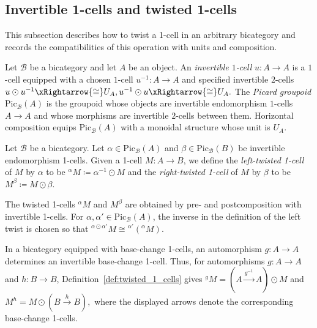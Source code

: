 \documentclass[11pt,oneside]{amsart}
\numberwithin{equation}{section}
\numberwithin{figure}{section}
\theoremstyle{plain}
\theoremstyle{definition}
\theoremstyle{remark}
\begin{document}
\subsection{Invertible 1-cells and twisted 1-cells}
This subsection describes how to twist a 1-cell in an arbitrary bicategory and records the compatibilities of this operation with units and composition.
\begin{definition}\label{def:invertible_1_cell}
Let \(\mathcal B\) be a bicategory and let \(A\) be an object.
An \emph{invertible \(1\)-cell} \(u\colon A\to A\) is a \(1\)-cell
equipped with a chosen \(1\)-cell \(u^{-1}\colon A\to A\) and
specified invertible \(2\)-cells
\(
u\odot u^{-1}\xRightarrow{\cong} U_A,
u^{-1}\odot u\xRightarrow{\cong} U_A.
\)
The \emph{Picard groupoid} \(\mathrm{Pic}_{\mathcal B}(A)\) is the groupoid
whose objects are invertible endomorphism \(1\)-cells \(A\to A\) and
whose morphisms are invertible \(2\)-cells between them. Horizontal
composition equips \(\mathrm{Pic}_{\mathcal B}(A)\) with a monoidal
structure whose unit is \(U_A\).
\end{definition}

\begin{definition}\label{def:twisted_1_cells}
Let $\mathcal B$ be a bicategory. Let $\alpha\in \mathrm{Pic}_{\mathcal B}(A)$ and $\beta\in \mathrm{Pic}_{\mathcal B}(B)$ be invertible endomorphism 1-cells. Given a 1-cell $M\colon A\to B$, we define the \emph{left-twisted 1-cell} of $M$ by $\alpha$ to be ${}^\alpha M \coloneqq \alpha^{-1}\odot M$ and the \emph{right-twisted 1-cell} of $M$ by $\beta$ to be $M^\beta \coloneqq M\odot \beta$.
\end{definition}

\begin{remark}\label{rem:base_change_twist}
The twisted 1-cells \({}^\alpha M\) and \(M^\beta\) are obtained by
pre- and postcomposition with invertible 1-cells. For
\(\alpha,\alpha'\in\mathrm{Pic}_{\mathcal B}(A)\), the inverse in the
definition of the left twist is chosen so that
\(
{}^{\alpha\odot\alpha'}M
\cong
{}^{\alpha'}({}^\alpha M).
\)

In a bicategory equipped with base-change 1-cells, an automorphism
\(g\colon A\to A\) determines an invertible base-change 1-cell.
Thus, for automorphisms \(g\colon A\to A\) and \(h\colon B\to B\),
Definition~\ref{def:twisted_1_cells} gives
\(
{}^gM=(A\xrightarrow{g^{-1}}A)\odot M\) and \(
M^h=M\odot(B\xrightarrow{h}B),
\)
where the displayed arrows denote the corresponding base-change
1-cells.
\end{remark}
\end{document}
